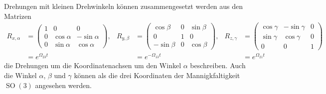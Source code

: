Drehungen mit kleinen Drehwinkeln können zusammengesetzt werden
aus den Matrizen
\begin{align*}
R_{x,\alpha}
&=
\begin{pmatrix}
1&0&0\\
0&\cos\alpha&-\sin\alpha\\
0&\sin\alpha& \cos\alpha
\end{pmatrix},
&
R_{y,\beta}
&=
\begin{pmatrix}
 \cos\beta&0&\sin\beta\\
      0    &1&     0    \\
-\sin\beta&0&\cos\beta
\end{pmatrix},
&
R_{z,\gamma}
&=
\begin{pmatrix}
\cos\gamma&-\sin\gamma&0\\
\sin\gamma& \cos\gamma&0\\
    0     &     0     &1
\end{pmatrix}
\\
&=
e^{\Omega_{23}t}
&
&=
e^{-\Omega_{13}t}
&
&=
e^{\Omega_{21}t}
\end{align*}
die Drehungen um die Koordinatenachsen um den Winkel $\alpha$
beschreiben.
Auch die Winkel $\alpha$, $\beta$ und $\gamma$ können als die
drei Koordinaten der Mannigkfaltigkeit $\operatorname{SO}(3)$
angesehen werden.

